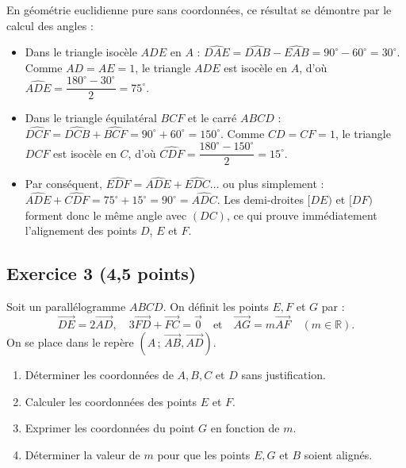 \documentclass[11pt,a4paper]{article}
\newcommand{\R}{\mathbb{R}}
\newcommand{\vect}[1]{\overrightarrow{#1}}
\begin{document}
\begin{remarquebox}
En géométrie euclidienne pure sans coordonnées, ce résultat se démontre par le calcul des angles :
\begin{itemize}[leftmargin=*,itemsep=1pt]
    \item Dans le triangle isocèle $ADE$ en $A$ : $\widehat{DAE} = \widehat{DAB} - \widehat{EAB} = 90^\circ - 60^\circ = 30^\circ$.
    Comme $AD = AE = 1$, le triangle $ADE$ est isocèle en $A$, d'où $\widehat{ADE} = \dfrac{180^\circ - 30^\circ}{2} = 75^\circ$.
    \item Dans le triangle équilatéral $BCF$ et le carré $ABCD$ : $\widehat{DCF} = \widehat{DCB} + \widehat{BCF} = 90^\circ + 60^\circ = 150^\circ$.
    Comme $CD = CF = 1$, le triangle $DCF$ est isocèle en $C$, d'où $\widehat{CDF} = \dfrac{180^\circ - 150^\circ}{2} = 15^\circ$.
    \item Par conséquent, $\widehat{EDF} = \widehat{ADE} + \widehat{EDC} \dots$ ou plus simplement :
    $\widehat{ADE} + \widehat{CDF} = 75^\circ + 15^\circ = 90^\circ = \widehat{ADC}$.
    Les demi-droites $[DE)$ et $[DF)$ forment donc le même angle avec $(DC)$, ce qui prouve immédiatement l'alignement des points $D$, $E$ et $F$.
\end{itemize}
\end{remarquebox}

\vspace{0.3cm}

\subsection*{Exercice 3 \hfill \normalfont\normalsize (4{,}5 points)}

Soit un parallélogramme $ABCD$. On définit les points $E, F$ et $G$ par :
\[
\vect{DE} = 2\vect{AD}, \quad 3\vect{FD} + \vect{FC} = \vect{0} \quad \text{et} \quad \vect{AG} = m\vect{AF} \quad (m \in \R).
\]
On se place dans le repère $(A\,;\, \vect{AB}, \vect{AD})$.

\begin{enumerate}
    \item Déterminer les coordonnées de $A, B, C$ et $D$ sans justification.
    \item Calculer les coordonnées des points $E$ et $F$.
    \item Exprimer les coordonnées du point $G$ en fonction de $m$.
    \item Déterminer la valeur de $m$ pour que les points $E, G$ et $B$ soient alignés.
\end{enumerate}
\end{document}
